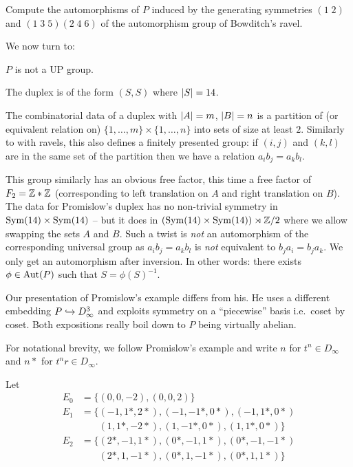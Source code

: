 \begin{exercise}
    Compute the automorphisms of $P$ induced by the generating symmetries $(1 \; 2)$ and $(1 \; 3 \; 5)(2 \; 4 \; 6)$ of the automorphism group of Bowditch's ravel.
\end{exercise}

We now turn to:
\begin{theorem}[Promislow]
    $P$ is not a UP group.
\end{theorem}
The duplex is of the form $(S, S)$ where $\lvert S \rvert = 14$.

The combinatorial data of a duplex with $\lvert A \rvert = m$, $\lvert B \rvert = n$ is a partition of (or equivalent relation on) $\{1, \dots, m\} \times \{1, \dots, n\}$ into sets of size at least $2$.
Similarly to with ravels, this also defines a finitely presented group: if $(i, j)$ and $(k, l)$ are in the same set of the partition then we have a relation $a_i b_j  = a_k b_l$.

This group similarly has an obvious free factor, this time a free factor of $F_2 = \mathbb{Z} * \mathbb{Z}$ (corresponding to left translation on $A$ and right translation on $B$).
The data for Promislow's duplex has no non-trivial symmetry in $\mathrm{Sym}(14) \times \mathrm{Sym}(14)$ -- but it does in $(\mathrm{Sym}(14) \times \mathrm{Sym}(14)) \rtimes \mathbb{Z}/2$ where we allow swapping the sets $A$ and $B$.
Such a twist is \emph{not} an automorphism of the corresponding universal group as $a_i b_j = a_k b_l$ is \emph{not} equivalent to $b_j a_i = b_j a_k$.
We only get an automorphism after inversion.
In other words: there exists $\phi \in \mathrm{Aut}(P)$ such that $S = \phi(S)^{-1}$.

\begin{remark}
    Our presentation of Promislow's example differs from his.
    He uses a different embedding $P \hookrightarrow D_\infty^3$ and exploits symmetry on a ``piecewise'' basis i.e.\ coset by coset.
    Both expositions really boil down to $P$ being virtually abelian.
\end{remark}

For notational brevity, we follow Promislow's example and write $n$ for $t^n \in D_\infty$ and $n*$ for $t^n r \in D_\infty$.

Let
\begin{align*}
    E_0 &= \{ (0, 0, -2), (0, 0, 2) \} \\
    E_1 &= \{ (-1, 1*, 2*), (-1, -1*, 0*), (-1, 1*, 0*) \\
        & \phantom{= \{} (1, 1*, -2*), (1, -1*, 0*), (1, 1*, 0*) \} \\
    E_2 &= \{ (2*, -1, 1*), (0*, -1, 1*), (0*, -1, -1*) \\
        & \phantom{= \{} (2*, 1, -1*), (0*, 1, -1*), (0*, 1, 1*) \}
\end{align*}

